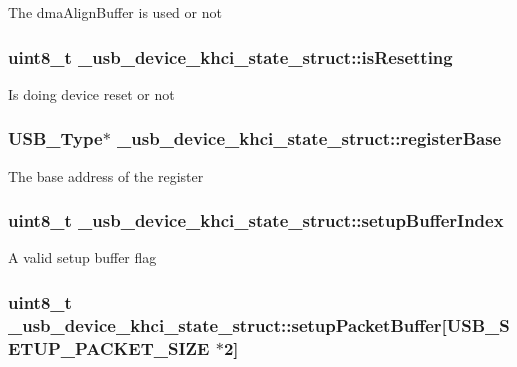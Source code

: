 The dma\-Align\-Buffer is used or not \hypertarget{struct__usb__device__khci__state__struct_afd210db81f2a9747019b128b3b49f0b8}{
\subsubsection[{is\-Resetting}]{\setlength{\rightskip}{0pt plus 5cm}uint8\-\_\-t \-\_\-usb\-\_\-device\-\_\-khci\-\_\-state\-\_\-struct\-::is\-Resetting}}\label{struct__usb__device__khci__state__struct_afd210db81f2a9747019b128b3b49f0b8}
Is doing device reset or not \hypertarget{struct__usb__device__khci__state__struct_a1558f2b2bc52c419b2332497af62e160}{
\subsubsection[{register\-Base}]{\setlength{\rightskip}{0pt plus 5cm}U\-S\-B\-\_\-\-Type$\ast$ \-\_\-usb\-\_\-device\-\_\-khci\-\_\-state\-\_\-struct\-::register\-Base}}\label{struct__usb__device__khci__state__struct_a1558f2b2bc52c419b2332497af62e160}
The base address of the register \hypertarget{struct__usb__device__khci__state__struct_ad0b7c5876d05379cf0d4a28c805c8d5b}{
\subsubsection[{setup\-Buffer\-Index}]{\setlength{\rightskip}{0pt plus 5cm}uint8\-\_\-t \-\_\-usb\-\_\-device\-\_\-khci\-\_\-state\-\_\-struct\-::setup\-Buffer\-Index}}\label{struct__usb__device__khci__state__struct_ad0b7c5876d05379cf0d4a28c805c8d5b}
A valid setup buffer flag \hypertarget{struct__usb__device__khci__state__struct_a1624706ecc6bfd364c81afa987f320bb}{
\subsubsection[{setup\-Packet\-Buffer}]{\setlength{\rightskip}{0pt plus 5cm}uint8\-\_\-t \-\_\-usb\-\_\-device\-\_\-khci\-\_\-state\-\_\-struct\-::setup\-Packet\-Buffer\mbox{[}{\bf U\-S\-B\-\_\-\-S\-E\-T\-U\-P\-\_\-\-P\-A\-C\-K\-E\-T\-\_\-\-S\-I\-Z\-E} $\ast$2\mbox{]}}}\label{struct__usb__device__khci__state__struct_a1624706ecc6bfd364c81afa987f320bb}
